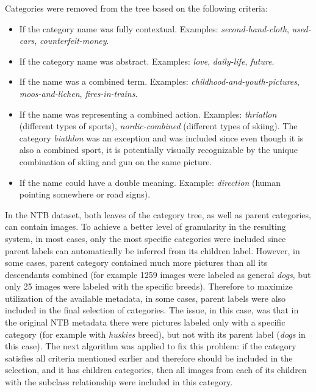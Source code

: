     Categories were removed from the tree based on the following criteria:
    \begin{itemize}
        \item If the category name was fully contextual. Examples: \textit{second-hand-cloth}, \textit{used-cars}, \textit{counterfeit-money}.
        \item If the category name was abstract. Examples: \textit{love}, \textit{daily-life}, \textit{future}.
        \item If the name was a combined term. Examples: \textit{childhood-and-youth-pictures}, \textit{moos-and-lichen}, \textit{fires-in-trains}. %
        \item If the name was representing a combined action. Examples: \textit{thriatlon} (different types of sports), \textit{nordic-combined} (different types of skiing). The category \textit{biathlon} was an exception and was included since even though it is also a combined sport, it is potentially visually recognizable by the unique combination of skiing and gun on the same picture.
        \item If the name could have a double meaning. Example: \textit{direction} (human pointing somewhere or road signs).
    \end{itemize}
    
    In the NTB dataset, both leaves of the category tree, as well as parent categories, can contain images. To achieve a better level of granularity in the resulting system, in most cases, only the most specific categories were included since parent labels can automatically be inferred from its children label. However, in some cases, parent category contained much more pictures than all its descendants combined (for example 1259 images were labeled as general \textit{dogs}, but only 25 images were labeled with the specific breeds). Therefore to maximize utilization of the available metadata, in some cases, parent labels were also included in the final selection of categories. The issue, in this case, was that in the original NTB metadata there were pictures labeled only with a specific category (for example with \textit{huskies} breed), but not with its parent label (\textit{dogs} in this case). The next algorithm was applied to fix this problem: if the category satisfies all criteria mentioned earlier and therefore should be included in the selection, and it has children categories, then all images from each of its children with the subclass relationship were included in this category.
    
